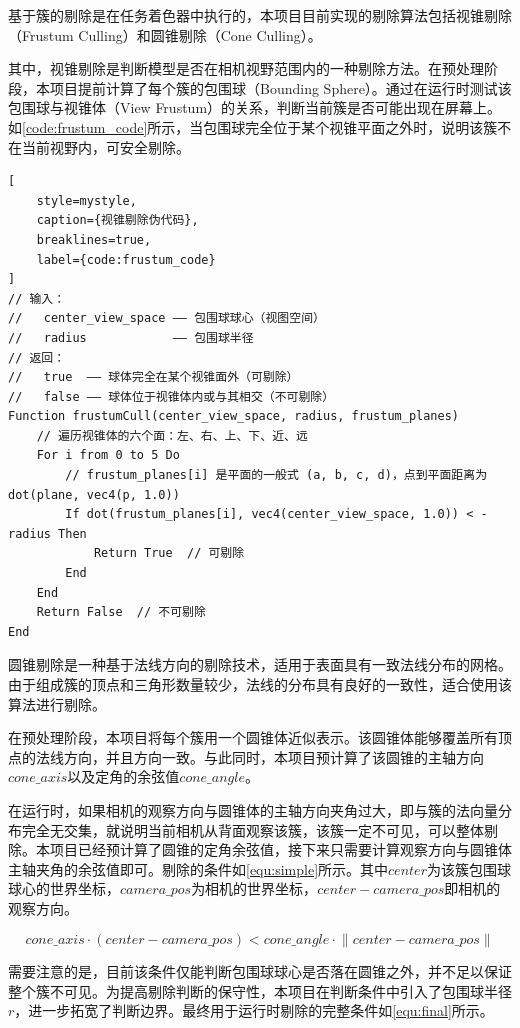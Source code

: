 基于簇的剔除是在任务着色器中执行的，本项目目前实现的剔除算法包括视锥剔除（Frustum Culling）和圆锥剔除（Cone Culling）。

其中，视锥剔除是判断模型是否在相机视野范围内的一种剔除方法。在预处理阶段，本项目提前计算了每个簇的包围球（Bounding Sphere）。通过在运行时测试该包围球与视锥体（View Frustum）的关系，判断当前簇是否可能出现在屏幕上。如\autoref{code:frustum_code}所示，当包围球完全位于某个视锥平面之外时，说明该簇不在当前视野内，可安全剔除。

\begin{lstlisting}[
    style=mystyle,
    caption={视锥剔除伪代码},
    breaklines=true, 
    label={code:frustum_code}
]
// 输入：
//   center_view_space —— 包围球球心（视图空间）
//   radius            —— 包围球半径
// 返回：
//   true  —— 球体完全在某个视锥面外（可剔除）
//   false —— 球体位于视锥体内或与其相交（不可剔除）
Function frustumCull(center_view_space, radius, frustum_planes)
    // 遍历视锥体的六个面：左、右、上、下、近、远
    For i from 0 to 5 Do
        // frustum_planes[i] 是平面的一般式 (a, b, c, d)，点到平面距离为 dot(plane, vec4(p, 1.0))
        If dot(frustum_planes[i], vec4(center_view_space, 1.0)) < -radius Then
            Return True  // 可剔除
        End
    End
    Return False  // 不可剔除
End
\end{lstlisting}

圆锥剔除是一种基于法线方向的剔除技术，适用于表面具有一致法线分布的网格。由于组成簇的顶点和三角形数量较少，法线的分布具有良好的一致性，适合使用该算法进行剔除。

在预处理阶段，本项目将每个簇用一个圆锥体近似表示。该圆锥体能够覆盖所有顶点的法线方向，并且方向一致。与此同时，本项目预计算了该圆锥的主轴方向$cone\_axis$以及定角的余弦值$cone\_angle$。

在运行时，如果相机的观察方向与圆锥体的主轴方向夹角过大，即与簇的法向量分布完全无交集，就说明当前相机从背面观察该簇，该簇一定不可见，可以整体剔除。本项目已经预计算了圆锥的定角余弦值，接下来只需要计算观察方向与圆锥体主轴夹角的余弦值即可。剔除的条件如\autoref{equ:simple}所示。其中$center$为该簇包围球球心的世界坐标，$camera\_pos$为相机的世界坐标，$center - camera\_pos$即相机的观察方向。

\begin{equation}
    \label{equ:simple}
    cone\_axis \cdot (center - camera\_pos) < cone\_angle \cdot \left\lVert center - camera\_pos \right\rVert
\end{equation}

需要注意的是，目前该条件仅能判断包围球球心是否落在圆锥之外，并不足以保证整个簇不可见。为提高剔除判断的保守性，本项目在判断条件中引入了包围球半径$r$，进一步拓宽了判断边界。最终用于运行时剔除的完整条件如\autoref{equ:final}所示。


